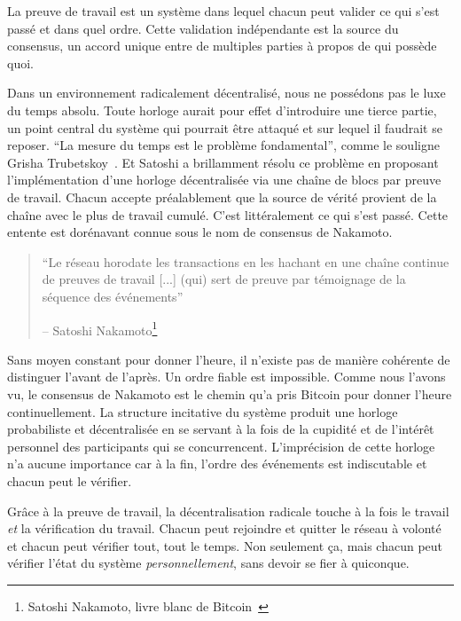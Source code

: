 La preuve de travail est un système dans lequel chacun peut valider ce qui s'est
passé et dans quel ordre. Cette validation indépendante est la source du
consensus, un accord unique entre de multiples parties à propos de qui possède
quoi.

Dans un environnement radicalement décentralisé, nous ne possédons pas le luxe
du temps absolu. Toute horloge aurait pour effet d'introduire une tierce partie,
un point central du système qui pourrait être attaqué et sur lequel il faudrait
se reposer. \enquote{La mesure du temps est le problème fondamental}, comme le
souligne Grisha Trubetskoy~\cite{pow-clock}. Et Satoshi a brillamment résolu ce
problème en proposant l'implémentation d'une horloge décentralisée via une
chaîne de blocs par preuve de travail. Chacun accepte préalablement que la
source de vérité provient de la chaîne avec le plus de travail cumulé. C'est
littéralement ce qui s'est passé. Cette entente est dorénavant connue sous le
nom de consensus de Nakamoto.

\begin{quotation}\begin{samepage}
\enquote{Le réseau horodate les transactions en les hachant en une chaîne
continue de preuves de travail [...] (qui) sert de preuve par témoignage de la
séquence des événements}
\begin{flushright} -- Satoshi Nakamoto\footnote{Satoshi Nakamoto, livre blanc de
Bitcoin~\cite{whitepaper}}
\end{flushright}\end{samepage}\end{quotation}

Sans moyen constant pour donner l'heure, il n'existe pas de manière cohérente de
distinguer l'avant de l'après. Un ordre fiable est impossible. Comme nous
l'avons vu, le consensus de Nakamoto est le chemin qu'a pris Bitcoin pour donner
l'heure continuellement. La structure incitative du système produit une horloge
probabiliste et décentralisée en se servant à la fois de la cupidité et de
l'intérêt personnel des participants qui se concurrencent. L'imprécision de
cette horloge n'a aucune importance car à la fin, l'ordre des événements est
indiscutable et chacun peut le vérifier.

Grâce à la preuve de travail, la décentralisation radicale touche à la fois le
travail \textit{et} la vérification du travail. Chacun peut rejoindre et quitter
le réseau à volonté et chacun peut vérifier tout, tout le temps. Non seulement
ça, mais chacun peut vérifier l'état du système \textit{personnellement}, sans
devoir se fier à quiconque.

